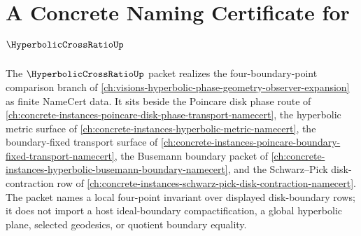 \chapter{A Concrete Naming Certificate for $\HyperbolicCrossRatioUp$}
\label{ch:concrete-instances-hyperbolic-cross-ratio-namecert}

The $\HyperbolicCrossRatioUp$ packet realizes the four-boundary-point comparison branch of \autoref{ch:visions-hyperbolic-phase-geometry-observer-expansion} as finite NameCert data. It sits beside the Poincare disk phase route of \autoref{ch:concrete-instances-poincare-disk-phase-transport-namecert}, the hyperbolic metric surface of \autoref{ch:concrete-instances-hyperbolic-metric-namecert}, the boundary-fixed transport surface of \autoref{ch:concrete-instances-poincare-boundary-fixed-transport-namecert}, the Busemann boundary packet of \autoref{ch:concrete-instances-hyperbolic-busemann-boundary-namecert}, and the Schwarz--Pick disk-contraction row of \autoref{ch:concrete-instances-schwarz-pick-disk-contraction-namecert}. The packet names a local four-point invariant over displayed disk-boundary rows; it does not import a host ideal-boundary compactification, a global hyperbolic plane, selected geodesics, or quotient boundary equality.

